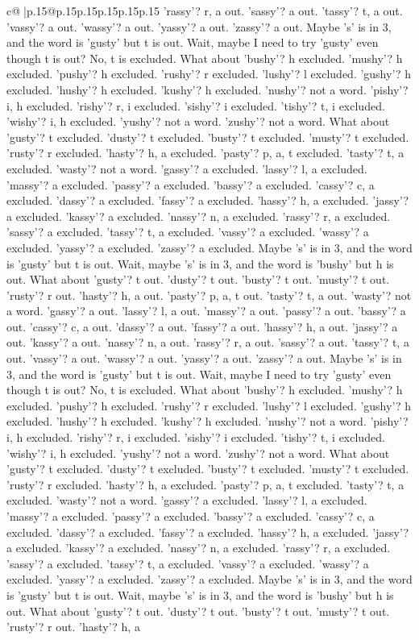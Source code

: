 \documentclass{article}
\begin{document}
{\begin{supertabular}{c@{$\;$}|p{.15\linewidth}@{}p{.15\linewidth}p{.15\linewidth}p{.15\linewidth}p{.15\linewidth}p{.15\linewidth}}
{{{'rassy'? r, a out. 'sassy'? a out. 'tassy'? t, a out. 'vassy'? a out. 'wassy'? a out. 'yassy'? a out. 'zassy'? a out. Maybe 's' is in 3, and the word is 'gusty' but t is out. Wait, maybe I need to try 'gusty' even though t is out? No, t is excluded. What about 'bushy'? h excluded. 'mushy'? h excluded. 'pushy'? h excluded. 'rushy'? r excluded. 'lushy'? l excluded. 'gushy'? h excluded. 'hushy'? h excluded. 'kushy'? h excluded. 'nushy'? not a word. 'pishy'? i, h excluded. 'rishy'? r, i excluded. 'sishy'? i excluded. 'tishy'? t, i excluded. 'wishy'? i, h excluded. 'yushy'? not a word. 'zushy'? not a word. What about 'gusty'? t excluded. 'dusty'? t excluded. 'busty'? t excluded. 'musty'? t excluded. 'rusty'? r excluded. 'hasty'? h, a excluded. 'pasty'? p, a, t excluded. 'tasty'? t, a excluded. 'wasty'? not a word. 'gassy'? a excluded. 'lassy'? l, a excluded. 'massy'? a excluded. 'passy'? a excluded. 'bassy'? a excluded. 'cassy'? c, a excluded. 'dassy'? a excluded. 'fassy'? a excluded. 'hassy'? h, a excluded. 'jassy'? a excluded. 'kassy'? a excluded. 'nassy'? n, a excluded. 'rassy'? r, a excluded. 'sassy'? a excluded. 'tassy'? t, a excluded. 'vassy'? a excluded. 'wassy'? a excluded. 'yassy'? a excluded. 'zassy'? a excluded. Maybe 's' is in 3, and the word is 'gusty' but t is out. Wait, maybe 's' is in 3, and the word is 'bushy' but h is out. What about 'gusty'? t out. 'dusty'? t out. 'busty'? t out. 'musty'? t out. 'rusty'? r out. 'hasty'? h, a out. 'pasty'? p, a, t out. 'tasty'? t, a out. 'wasty'? not a word. 'gassy'? a out. 'lassy'? l, a out. 'massy'? a out. 'passy'? a out. 'bassy'? a out. 'cassy'? c, a out. 'dassy'? a out. 'fassy'? a out. 'hassy'? h, a out. 'jassy'? a out. 'kassy'? a out. 'nassy'? n, a out. 'rassy'? r, a out. 'sassy'? a out. 'tassy'? t, a out. 'vassy'? a out. 'wassy'? a out. 'yassy'? a out. 'zassy'? a out. Maybe 's' is in 3, and the word is 'gusty' but t is out. Wait, maybe I need to try 'gusty' even though t is out? No, t is excluded. What about 'bushy'? h excluded. 'mushy'? h excluded. 'pushy'? h excluded. 'rushy'? r excluded. 'lushy'? l excluded. 'gushy'? h excluded. 'hushy'? h excluded. 'kushy'? h excluded. 'nushy'? not a word. 'pishy'? i, h excluded. 'rishy'? r, i excluded. 'sishy'? i excluded. 'tishy'? t, i excluded. 'wishy'? i, h excluded. 'yushy'? not a word. 'zushy'? not a word. What about 'gusty'? t excluded. 'dusty'? t excluded. 'busty'? t excluded. 'musty'? t excluded. 'rusty'? r excluded. 'hasty'? h, a excluded. 'pasty'? p, a, t excluded. 'tasty'? t, a excluded. 'wasty'? not a word. 'gassy'? a excluded. 'lassy'? l, a excluded. 'massy'? a excluded. 'passy'? a excluded. 'bassy'? a excluded. 'cassy'? c, a excluded. 'dassy'? a excluded. 'fassy'? a excluded. 'hassy'? h, a excluded. 'jassy'? a excluded. 'kassy'? a excluded. 'nassy'? n, a excluded. 'rassy'? r, a excluded. 'sassy'? a excluded. 'tassy'? t, a excluded. 'vassy'? a excluded. 'wassy'? a excluded. 'yassy'? a excluded. 'zassy'? a excluded. Maybe 's' is in 3, and the word is 'gusty' but t is out. Wait, maybe 's' is in 3, and the word is 'bushy' but h is out. What about 'gusty'? t out. 'dusty'? t out. 'busty'? t out. 'musty'? t out. 'rusty'? r out. 'hasty'? h, a }}}
\end{supertabular}}
\end{document}
